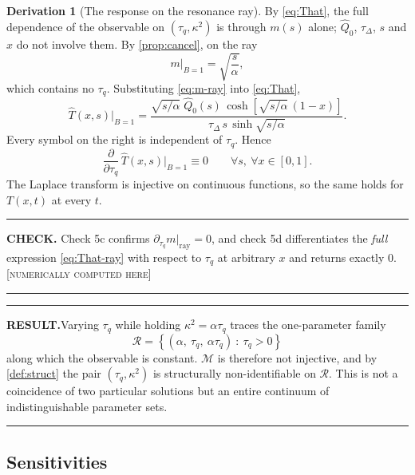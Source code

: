 \documentclass[11pt,a4paper]{article}
\theoremstyle{definition}
\newtheorem{derivationx}{Derivation}[section]
\newenvironment{checkbox}%
  {\par\medskip\noindent\begin{minipage}{\linewidth}%
   \rule{\linewidth}{0.4pt}\par\noindent\textbf{CHECK.}\enspace}%
  {\par\rule{\linewidth}{0.4pt}\end{minipage}\par\medskip}
\newenvironment{resultbox}%
  {\par\medskip\noindent\begin{minipage}{\linewidth}%
   \rule{\linewidth}{1.0pt}\par\noindent\textbf{RESULT.}\enspace}%
  {\par\rule{\linewidth}{1.0pt}\end{minipage}\par\medskip}
\newcommand{\NUM}{\textcolor{red!55!black}{\footnotesize[\textsc{numerically computed here}]}}
\newcommand{\tq}{\tau_{q}}
\newcommand{\kk}{\kappa^{2}}
\newcommand{\Bnum}{B}
\newcommand{\Lap}[1]{\hat{#1}}
\begin{document}
\begin{derivationx}[The response on the resonance ray]
\label{der:resp-ray}
By \eqref{eq:That}, the full dependence of the observable on $(\tq,\kk)$ is
through $m(s)$ alone; $\Lap Q_{0}$, $\tau_{\Delta}$, $s$ and $x$ do not involve
them. By \cref{prop:cancel}, on the ray
\begin{equation}
  m\big|_{\Bnum=1} = \sqrt{\frac{s}{\alpha}} ,
  \label{eq:m-ray}
\end{equation}
which contains no $\tq$. Substituting \eqref{eq:m-ray} into \eqref{eq:That},
\begin{equation}
  \Lap T(x,s)\Big|_{\Bnum=1}
   = \frac{\sqrt{s/\alpha}\;\Lap Q_{0}(s)\,
           \cosh\!\left[\sqrt{s/\alpha}\,(1-x)\right]}
          {\tau_{\Delta}\,s\,\sinh\!\sqrt{s/\alpha}} .
  \label{eq:That-ray}
\end{equation}
Every symbol on the right is independent of $\tq$. Hence
\begin{equation}
  \frac{\partial}{\partial \tq}\,
  \Lap T(x,s)\Big|_{\Bnum=1} \equiv 0
  \qquad \forall s,\ \forall x\in[0,1] .
  \label{eq:dTdtq-ray}
\end{equation}
The Laplace transform is injective on continuous functions, so the same holds
for $T(x,t)$ at every $t$.
\end{derivationx}

\begin{checkbox}
Check 5c confirms $\partial_{\tq}m|_{\text{ray}}=0$, and check 5d differentiates
the \emph{full} expression \eqref{eq:That-ray} with respect to $\tq$ at
arbitrary $x$ and returns exactly $0$. \NUM
\end{checkbox}

\begin{resultbox}[Non-injectivity]
Varying $\tq$ while holding $\kk=\alpha\tq$ traces the one-parameter family
\begin{equation}
  \mathcal{R}=\left\{(\alpha,\ \tq,\ \alpha\tq)\ :\ \tq>0\right\}
  \label{eq:family}
\end{equation}
along which the observable is constant. $\mathcal{M}$ is therefore not
injective, and by \cref{def:struct} the pair $(\tq,\kk)$ is structurally
non-identifiable on $\mathcal{R}$. This is not a coincidence of two particular
solutions but an entire continuum of indistinguishable parameter sets.
\end{resultbox}

\subsection{Sensitivities}
\end{document}
